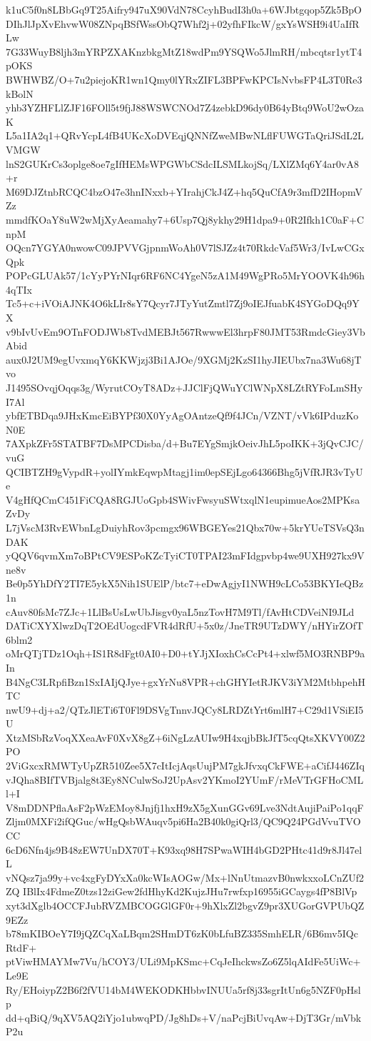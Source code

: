 k1uC5f0n8LBbGq9T25Aifry947uX90VdN78CcyhBudI3h0a+6WJbtgqop5Zk5BpO
DIhJlJpXvEhvwW08ZNpqBSfWssObQ7Whf2j+02yfhFIkcW/gxYsWSH9i4UaIfRLw
7G33WuyB8ljh3mYRPZXAKnzbkgMtZ18wdPm9YSQWo5JlmRH/mbcqtsr1ytT4pOKS
BWHWBZ/O+7u2piejoKR1wn1Qmy0lYRxZIFL3BPFwKPCIsNvbsFP4L3T0Re3kBolN
yhb3YZHFLlZJF16FOll5t9fjJ88WSWCNOd7Z4zebkD96dy0B64yBtq9WoU2wOzaK
L5a1IA2q1+QRvYcpL4fB4UKcXoDVEqjQNNfZweMBwNLflFUWGTaQriJSdL2LVMGW
lnS2GUKrCs3oplge8oe7gIfHEMsWPGWbCSdcILSMLkojSq/LXlZMq6Y4ar0vA8+r
M69DJZtnbRCQC4bzO47e3hnINxxb+YIrahjCkJ4Z+hq5QuCfA9r3mfD2IHopmVZz
mmdfKOaY8uW2wMjXyAeamahy7+6Usp7Qj8ykhy29H1dpa9+0R2Ifkh1C0aF+CnpM
OQcn7YGYA0nwowC09JPVVGjpnmWoAh0V7lSJZz4t70RkdcVaf5Wr3/IvLwCGxQpk
POPcGLUAk57/1cYyPYrNIqr6RF6NC4YgeN5zA1M49WgPRo5MrYOOVK4h96h4qTIx
Tc5+c+iVOiAJNK4O6kLIr8sY7Qcyr7JTyYutZmtl7Zj9oIEJfuabK4SYGoDQq9YX
v9bIvUvEm9OTnFODJWb8TvdMEBJt567RwwwEl3hrpF80JMT53RmdcGiey3VbAbid
aux0J2UM9egUvxmqY6KKWjzj3Bi1AJOe/9XGMj2KzSI1hyJIEUbx7na3Wu68jTvo
J1495SOvqjOqqs3g/WyrutCOyT8ADz+JJClFjQWuYClWNpX8LZtRYFoLmSHyI7Al
ybfETBDqa9JHxKmcEiBYPf30X0YyAgOAntzeQf9f4JCn/VZNT/vVk6IPduzKoN0E
7AXpkZFr5STATBF7DsMPCDisba/d+Bu7EYgSmjkOeivJhL5poIKK+3jQvCJC/vuG
QCIBTZH9gVypdR+yolIYmkEqwpMtagj1im0epSEjLgo64366Bhg5jVfRJR3vTyUe
V4gHfQCmC451FiCQA8RGJUoGpb4SWivFwsyuSWtxqlN1eupimueAos2MPKsaZvDy
L7jVscM3RvEWbnLgDuiyhRov3pcmgx96WBGEYes21Qbx70w+5krYUeTSVsQ3nDAK
yQQV6qvmXm7oBPtCV9ESPoKZcTyiCT0TPAI23mFIdgpvbp4we9UXH927kx9Vne8v
Be0p5YhDfY2TI7E5ykX5Nih1SUElP/btc7+eDwAgjyI1NWH9cLCo53BKYIeQBz1n
cAuv80fsMc7ZJc+1LlBsUsLwUbJisgv0yaL5nzTovH7M9Tl/fAvHtCDVeiNI9JLd
DATiCXYXlwzDqT2OEdUogcdFVR4dRfU+5x0z/JneTR9UTzDWY/nHYirZOfT6blm2
oMrQTjTDz1Oqh+IS1R8dFgt0AI0+D0+tYJjXIoxhCsCcPt4+xlwf5MO3RNBP9aIn
B4NgC3LRpfiBzn1SxIAIjQJye+gxYrNu8VPR+chGHYIetRJKV3iYM2MtbhpehHTC
nwU9+dj+a2/QTzJlETi6T0Fl9DSVgTnnvJQCy8LRDZtYrt6mlH7+C29d1VSiEI5U
XtzMSbRzVoqXXeaAvF0XvX8gZ+6iNgLzAUIw9H4xqjbBkJfT5cqQtsXKVY00Z2PO
2ViGxcxRMWTyUpZR510Zee5X7cItIcjAqsUujPM7gkJfvxqCkFWE+aCifJ446ZIq
vJQha8BIfTVBjalg8t3Ey8NCulwSoJ2UpAsv2YKmoI2YUmF/rMeVTrGFHoCMLl+I
V8mDDNPflaAsF2pWzEMoy8Jnjfj1hxH9zX5gXunGGv69Lve3NdtAujiPaiPo1qqF
Zljm0MXFi2ifQGuc/wHgQsbWAuqv5pi6Ha2B40k0giQrl3/QC9Q24PGdVvuTVOCC
6cD6Nfn4js9B48zEW7UnDX70T+K93xq98H7SPwaWIH4bGD2PHtc41d9r8Jl47elL
vNQsz7ja99y+vc4xgFyDYxXa0kcWIsAOGw/Mx+lNnUtmazvB0nwkxxoLCnZUf2ZQ
IBlIx4FdmeZ0tzs12ziGew2fdHhyKd2KujzJHu7rwfxp16955iGCaygs4fP8BlVp
xyt3dXglb4OCCFJubRVZMBCOGGlGF0r+9hXlxZl2bgvZ9pr3XUGorGVPUbQZ9EZz
b78mKIBOeY7I9jQZCqXaLBqm2SHmDT6zK0bLfuBZ335SmhELR/6B6mv5IQcRtdF+
ptViwHMAYMw7Vu/hCOY3/ULi9MpKSmc+CqJeIhckwsZo6Z5lqAIdFe5UiWc+Le9E
Ry/EHoiypZ2B6f2fVU14bM4WEKODKHbbvINUUa5rf8j33sgrItUn6g5NZF0pHslp
dd+qBiQ/9qXV5AQ2iYjo1ubwqPD/Jg8hDs+V/naPcjBiUvqAw+DjT3Gr/mVbkP2u
